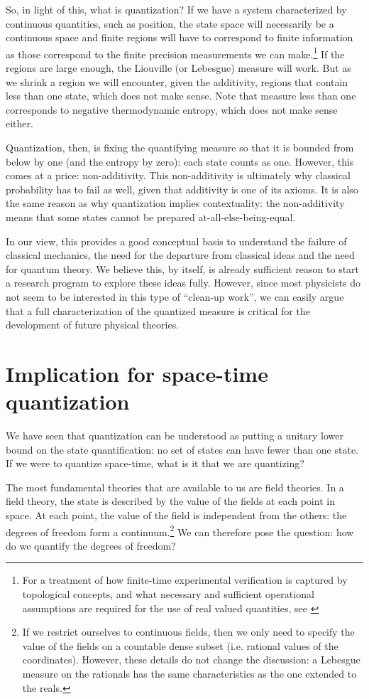 \documentclass[10pt,twocolumn, nofootinbib]{revtex4-2}
\begin{document}
So, in light of this, what is quantization? If we have a system characterized by continuous quantities, such as position, the state space will necessarily be a continuous space and finite regions will have to correspond to finite information as those correspond to the finite precision measurements we can make.\footnote{For a treatment of how finite-time experimental verification is captured by topological concepts, and what necessary and sufficient operational assumptions are required for the use of real valued quantities, see \cite{aop-book}} If the regions are large enough, the Liouville (or Lebesgue) measure will work. But as we shrink a region we will encounter, given the additivity, regions that contain less than one state, which does not make sense. Note that measure less than one corresponds to negative thermodynamic entropy, which does not make sense either.

Quantization, then, is fixing the quantifying measure so that it is bounded from below by one (and the entropy by zero): each state counts as one. However, this comes at a price: non-additivity. This non-additivity is ultimately why classical probability has to fail as well, given that additivity is one of its axioms. It is also the same reason as why quantization implies contextuality: the non-additivity means that some states cannot be prepared at-all-else-being-equal.

In our view, this provides a good conceptual basis to understand the failure of classical mechanics, the need for the departure from classical ideas and the need for quantum theory. We believe this, by itself, is already sufficient reason to start a research program to explore these ideas fully. However, since most physicists do not seem to be interested in this type of ``clean-up work'', we can easily argue that a full characterization of the quantized measure is critical for the development of future physical theories.

\section{Implication for space-time quantization}

We have seen that quantization can be understood as putting a unitary lower bound on the state quantification: no set of states can have fewer than one state. If we were to quantize space-time, what is it that we are quantizing?

The most fundamental theories that are available to us are field theories. In a field theory, the state is described by the value of the fields at each point in space. At each point, the value of the field is independent from the others: the degrees of freedom form a continuum.\footnote{If we restrict ourselves to continuous fields, then we only need to specify the value of the fields on a countable dense subset (i.e. rational values of the coordinates). However, these details do not change the discussion: a Lebesgue measure on the rationals has the same characteristics as the one extended to the reals.} We can therefore pose the question: how do we quantify the degrees of freedom?
\end{document}
